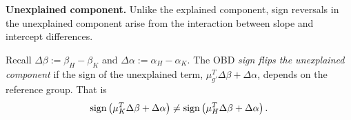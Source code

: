 

\textbf{Unexplained component.}
Unlike the explained component, sign reversals in the unexplained component arise from the interaction between slope and intercept differences.
\begin{definition}
    \label{def:unexplained_sign_flip}
	Recall $\Delta\beta := \beta_H - \beta_K$ and $\Delta\alpha := \alpha_H - \alpha_K$. The OBD \emph{sign flips the unexplained component} if the sign of the unexplained term, $\mu_{g'}^T \Delta\beta + \Delta\alpha$, depends on the reference group. That is
	\begin{equation}
		\operatorname{sign}\left( \mu_K^T \Delta\beta + \Delta\alpha \right) \neq \operatorname{sign}\left( \mu_H^T \Delta\beta + \Delta\alpha \right).
	\end{equation}
\end{definition}

